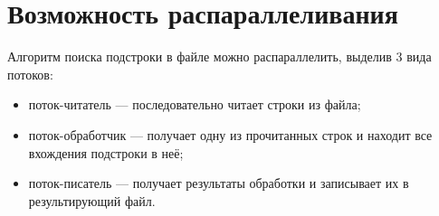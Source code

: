 \section{Возможность распараллеливания}

Алгоритм поиска подстроки в файле можно распараллелить, выделив 3 вида потоков:
\begin{itemize}
    \item поток-читатель --- последовательно читает строки из файла;
    \item поток-обработчик --- получает одну из прочитанных строк и находит все вхождения подстроки в неё;
    \item поток-писатель --- получает результаты обработки и записывает их в результирующий файл.
\end{itemize}
